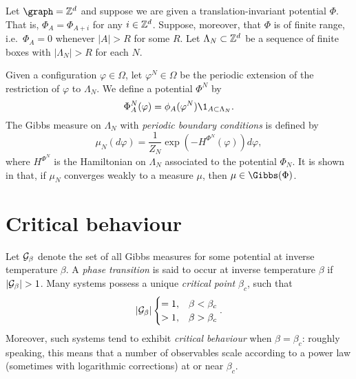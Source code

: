 \begin{example}
Let $\graph = \Zd$ and suppose we are given a translation-invariant potential $\Phi$.
That is, $\Phi_A = \Phi_{A + i}$ for any $i \in { {{\mathbb Z}}^d }$.
Suppose, moreover, that $\Phi$ is of finite range, i.e.\ $\Phi_A = 0$ whenever
$|A| > R$ for some $R$. Let $\Lambda_N \subset { {{\mathbb Z}}^d }$ be a sequence of finite boxes
with $|\Lambda_N| > R$ for each $N$.

Given a configuration $\varphi \in \Omega$, let $\varphi^N \in \Omega$
be the periodic extension of the restriction of $\varphi$ to $\Lambda_N$.
We define a potential $\Phi^N$ by
\begin{equation}
\Phi^N_A(\varphi) = \phi_A(\varphi^N) \1_{A \subset \Lambda_N}.
\end{equation}
The Gibbs measure on $\Lambda_N$ with \emph{periodic boundary conditions} is defined by
\begin{equation}
\mu_N(d\varphi) = \frac{1}{Z_N} \exp\left(-H^{\Phi^N}(\varphi)\right) d\varphi,
\end{equation}
where $H^{\Phi^N}$ is the Hamiltonian on $\Lambda_N$ associated to the potential $\Phi_N$.
It is shown in \cite[Example 4.20]{Georgii11} that, if $\mu_N$ converges weakly to a
measure $\mu$, then $\mu \in \Gibbs(\Phi)$.
\end{example}



\section{Critical behaviour}

Let $\mathcal{G}_\beta$ denote the set of all Gibbs measures for some potential at inverse temperature
$\beta$. A \emph{phase transition} is said to occur at inverse temperature $\beta$ if
$|\mathcal{G}_\beta| > 1$. Many systems possess a unique \emph{critical point} $\beta_c$, such that
\begin{equation}
|\mathcal{G}_\beta|
\begin{cases}
=1,  & \beta < \beta_c \\
> 1, & \beta > \beta_c
\end{cases}.
\end{equation}
Moreover, such systems tend to exhibit \emph{critical behaviour} when $\beta = \beta_c$:
roughly speaking, this means that a number of observables scale according to a power
law (sometimes with logarithmic corrections) at or near $\beta_c$.

